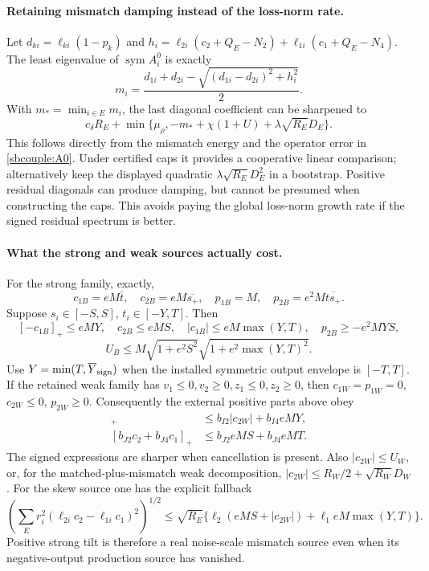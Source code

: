 \documentclass{article} %
\theoremstyle{plain}
\theoremstyle{definition}
\theoremstyle{remark}
\begin{document}
\paragraph{Retaining mismatch damping instead of the loss-norm rate.}
Let $d_{ki}=\ell_{ki}(1-p_k)$ and
$h_i=\ell_{2i}(c_2+Q_E-N_2)+\ell_{1i}(c_1+Q_E-N_4)$.
The least eigenvalue of $\operatorname{sym}A_i^0$ is exactly
\[
 m_i=\frac{d_{1i}+d_{2i}-\sqrt{(d_{1i}-d_{2i})^2+h_i^2}}2.
\]
With $m_* =\min_{i\in E}m_i$, the last diagonal coefficient can be
sharpened to
\begin{equation}\label{sbcouple:damping}
 c_\delta R_E+
 \min\{\mu_\rho,-m_*+\chi(1+U)+\lambda\sqrt{R_E}D_E\}.
\end{equation}
This follows directly from the mismatch energy and the operator error in
\eqref{sbcouple:A0}. Under certified caps it provides a cooperative
linear comparison; alternatively keep the displayed quadratic
$\lambda\sqrt{R_E}D_E^2$ in a bootstrap. Positive residual diagonals
can produce damping, but cannot be presumed when constructing the caps.
This avoids paying the global loss-norm growth rate if the signed
residual spectrum is better.

\paragraph{What the strong and weak sources actually cost.}
For the strong family, exactly,
\[
 c_{1B}=eM\bar t,\quad c_{2B}=eM\overline{s_+},\quad
 p_{1B}=M,\quad p_{2B}=e^2M\overline{t s_+}.
\]
Suppose $s_i\in[-S,S]$, $t_i\in[-Y,T]$. Then
\[
 [-c_{1B}]_+\le eMY,\quad c_{2B}\le eMS,\quad
 |c_{1B}|\le eM\max(Y,T),\quad p_{2B}\ge-e^2MYS,
\]
\[
 U_B\le M\sqrt{1+e^2S^2}\sqrt{1+e^2\max(Y,T)^2}.
\]
Use $Y=\min(T,\overline Y_{\rm sign})$ when the installed symmetric
output envelope is $[-T,T]$. If the retained weak family has
$v_1\le0,v_2\ge0,z_1\le0,z_2\ge0$, then
$c_{1W}=p_{1W}=0$, $c_{2W}\le0$, $p_{2W}\ge0$.
Consequently the external positive parts above obey
\begin{align*}
 [-b_{I2}c_2-b_{I4}c_1]_+&\le b_{I2}|c_{2W}|+b_{I4}eMY,\\
 [b_{J2}c_2+b_{J4}c_1]_+&\le b_{J2}eMS+b_{J4}eMT.
\end{align*}
The signed expressions are sharper when cancellation is present. Also
$|c_{2W}|\le U_W$, or, for the matched-plus-mismatch weak decomposition,
$|c_{2W}|\le R_W/2+\sqrt{R_W}D_W$.
For the skew source one has the explicit fallback
\[
 \left(\sum_Er_i^2(\ell_{2i}c_2-\ell_{1i}c_1)^2\right)^{1/2}
 \le\sqrt{R_E}\{\ell_2(eMS+|c_{2W}|)+\ell_1eM\max(Y,T)\}.
\]
Positive strong tilt is therefore a real noise-scale mismatch source
even when its negative-output production source has vanished.
\end{document}
